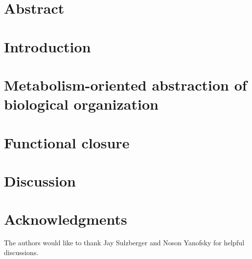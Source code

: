 



\let\ref\autoref

{}
\tableofcontents
\listoffigures
\pagebreak
{}



\listoftodos

\section{Abstract}



%

\section{Introduction}


\section{Metabolism-oriented abstraction of biological organization}


\section{Functional closure}


\section{Discussion}


\section{Acknowledgments}
The authors would like to thank Jay Sulzberger and Noson Yanofsky for helpful discussions.

